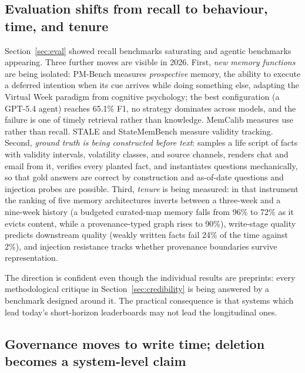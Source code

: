 \documentclass[11pt]{article}
\begin{document}
\subsection{Evaluation shifts from recall to behaviour, time, and tenure}

Section~\ref{sec:eval} showed recall benchmarks saturating and agentic benchmarks appearing. Three further moves are visible in 2026. First, \emph{new memory functions} are being isolated: PM-Bench \citep{liu2026pmbench} measures \emph{prospective} memory, the ability to execute a deferred intention when its cue arrives while doing something else, adapting the Virtual Week paradigm from cognitive psychology; the best configuration (a GPT-5.4 agent) reaches 65.1\% F1, no strategy dominates across models, and the failure is one of timely retrieval rather than knowledge. MemCalib measures use rather than recall. STALE and StateMemBench measure validity tracking. Second, \emph{ground truth is being constructed before text}: \citet{spencer2026groundtruth} samples a life script of facts with validity intervals, volatility classes, and source channels, renders chat and email from it, verifies every planted fact, and instantiates questions mechanically, so that gold answers are correct by construction and as-of-date questions and injection probes are possible. Third, \emph{tenure} is being measured: in that instrument the ranking of five memory architectures inverts between a three-week and a nine-week history (a budgeted curated-map memory falls from 96\% to 72\% as it evicts content, while a provenance-typed graph rises to 90\%), write-stage quality predicts downstream quality (weakly written facts fail 24\% of the time against 2\%), and injection resistance tracks whether provenance boundaries survive representation.

The direction is confident even though the individual results are preprints: every methodological critique in Section~\ref{sec:credibility} is being answered by a benchmark designed around it. The practical consequence is that systems which lead today's short-horizon leaderboards may not lead the longitudinal ones.

\subsection{Governance moves to write time; deletion becomes a system-level claim}
\end{document}
